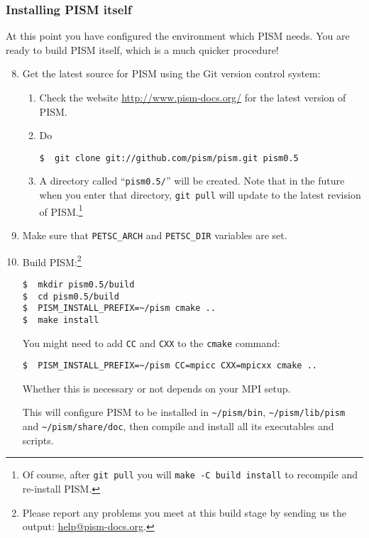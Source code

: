 \documentclass[titlepage,letterpaper,final]{scrartcl}
\begin{document}
\subsubsection{Installing PISM itself}
\label{sec:install-cmake}
At this point you have configured the environment which PISM needs.  You are ready to build PISM itself, which is a much quicker procedure!

\begin{enumerate}\setcounter{enumi}{7}
\item Get the latest source for PISM using the Git version control system:
\begin{enumerate}
\item \label{getPISMstep} Check the website \url{http://www.pism-docs.org/} for the latest version of PISM.
\item Do
\begin{verbatim}
$  git clone git://github.com/pism/pism.git pism0.5
\end{verbatim}
\item A directory called ``\texttt{pism0.5/}'' will be created.  Note that in the future when you enter that directory,
  \texttt{git pull} will update to the latest revision of PISM.\footnote{Of course, after \texttt{git pull} you will \texttt{make -C
      build install} to recompile and re-install PISM.}
\end{enumerate}

\item Make sure that \texttt{PETSC_ARCH} and \texttt{PETSC_DIR} variables are set.

\item Build PISM:\footnote{Please report any problems you meet at this build stage by sending us the output: \href{mailto:help@pism-docs.org}{help@pism-docs.org}.}
\begin{verbatim}
$  mkdir pism0.5/build
$  cd pism0.5/build
$  PISM_INSTALL_PREFIX=~/pism cmake ..
$  make install
\end{verbatim}

You might need to add \texttt{CC} and \texttt{CXX} to the \texttt{cmake}
command:
\begin{verbatim}
$  PISM_INSTALL_PREFIX=~/pism CC=mpicc CXX=mpicxx cmake ..
\end{verbatim}
Whether this is necessary or not depends on your MPI setup.

This will configure PISM to be installed in \texttt{\textasciitilde/pism/bin},
\texttt{\textasciitilde/pism/lib/pism} and
\texttt{\textasciitilde/pism/share/doc}, then compile and install all its
executables and scripts.


\end{enumerate}
\end{document}
